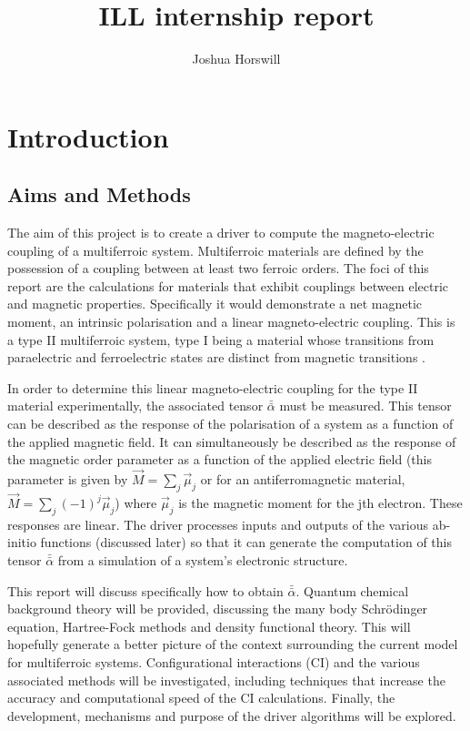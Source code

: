 \documentclass[10pt]{article}
\author{Joshua Horswill}
\title{ILL internship report}
\begin{document}
\maketitle
\tableofcontents
\section{Introduction}
\subsection{Aims and Methods}
The aim of this project is to create a driver to compute the magneto-electric coupling of a multiferroic system. Multiferroic materials are defined by the possession of a coupling between at least two ferroic orders. The foci of this report are the calculations for materials that exhibit couplings between electric and magnetic properties. Specifically it would demonstrate a net magnetic moment, an intrinsic polarisation and a linear magneto-electric coupling. This is a type II multiferroic system, type I being a material whose transitions from paraelectric and ferroelectric states are distinct from magnetic transitions \cite{Hur2004}\cite{goto2004ferroelectricity}.

In order to determine this linear magneto-electric coupling for the type II material experimentally, the associated tensor $\bar{\bar{\alpha}}$ must be measured. This tensor can be described as the response of the polarisation of a system as a function of the applied magnetic field. It can simultaneously be described as the response of the magnetic order parameter as a function of the applied electric field (this parameter is given by $\vec{M} = \sum_j \vec{\mu}_j$ or for an antiferromagnetic material, $\vec{M} = \sum_j (-1)^j \vec{\mu}_j$) where $\vec{\mu}_j$ is the magnetic moment for the jth electron. These responses are linear. The driver processes inputs and outputs of the various ab-initio functions (discussed later) so that it can generate the computation of this tensor $\bar{\bar{\alpha}}$ from a simulation of a system's electronic structure.

This report will discuss specifically how to obtain $\bar{\bar{\alpha}}$. Quantum chemical background theory will be provided, discussing the many body Schrödinger equation, Hartree-Fock methods and density functional theory. This will hopefully generate a better picture of the context surrounding the current model for multiferroic systems. Configurational interactions (CI) and the various associated methods will be investigated, including techniques that increase the accuracy and computational speed of the CI calculations. Finally, the development, mechanisms and purpose of the driver algorithms will be explored.
\end{document}
